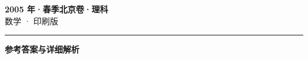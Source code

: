 \documentclass[zihao=5, a4paper]{ctexart}
\begin{document}
\begin{center}
  {\Large\bfseries 2005 年·春季北京卷·理科}\\[4pt]
  {\large 数学 · 印刷版}
\end{center}
\medskip
{}

\par\bigskip\hrule\bigskip
{}
\begin{center}{\large\bfseries 参考答案与详细解析}\end{center}
\smallskip

\end{document}
